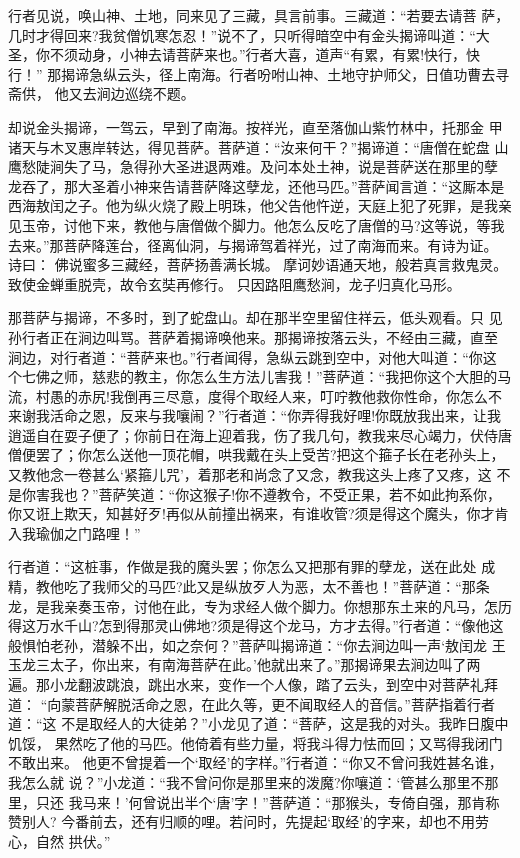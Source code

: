 行者见说，唤山神、土地，同来见了三藏，具言前事。三藏道：“若要去请菩
萨，几时才得回来?我贫僧饥寒怎忍！”说不了，只听得暗空中有金头揭谛叫道：“大
圣，你不须动身，小神去请菩萨来也。”行者大喜，道声“有累，有累!快行，快行！”
那揭谛急纵云头，径上南海。行者吩咐山神、土地守护师父，日值功曹去寻斋供，
他又去涧边巡绕不题。

却说金头揭谛，一驾云，早到了南海。按祥光，直至落伽山紫竹林中，托那金
甲诸天与木叉惠岸转达，得见菩萨。菩萨道：“汝来何干？”揭谛道：“唐僧在蛇盘
山鹰愁陡涧失了马，急得孙大圣进退两难。及问本处土神，说是菩萨送在那里的孽
龙吞了，那大圣着小神来告请菩萨降这孽龙，还他马匹。”菩萨闻言道：“这厮本是
西海敖闰之子。他为纵火烧了殿上明珠，他父告他忤逆，天庭上犯了死罪，是我亲
见玉帝，讨他下来，教他与唐僧做个脚力。他怎么反吃了唐僧的马?这等说，等我
去来。”那菩萨降莲台，径离仙洞，与揭谛驾着祥光，过了南海而来。有诗为证。
诗曰：
佛说蜜多三藏经，菩萨扬善满长城。
摩诃妙语通天地，般若真言救鬼灵。
致使金蝉重脱壳，故令玄奘再修行。
只因路阻鹰愁涧，龙子归真化马形。

那菩萨与揭谛，不多时，到了蛇盘山。却在那半空里留住祥云，低头观看。只
见孙行者正在涧边叫骂。菩萨着揭谛唤他来。那揭谛按落云头，不经由三藏，直至
涧边，对行者道：“菩萨来也。”行者闻得，急纵云跳到空中，对他大叫道：“你这
个七佛之师，慈悲的教主，你怎么生方法儿害我！”菩萨道：“我把你这个大胆的马
流，村愚的赤尻!我倒再三尽意，度得个取经人来，叮咛教他救你性命，你怎么不
来谢我活命之恩，反来与我嚷闹？”行者道：“你弄得我好哩!你既放我出来，让我
逍遥自在耍子便了；你前日在海上迎着我，伤了我几句，教我来尽心竭力，伏侍唐
僧便罢了；你怎么送他一顶花帽，哄我戴在头上受苦?把这个箍子长在老孙头上，
又教他念一卷甚么‘紧箍儿咒’，着那老和尚念了又念，教我这头上疼了又疼，这
不是你害我也？”菩萨笑道：“你这猴子!你不遵教令，不受正果，若不如此拘系你，
你又诳上欺天，知甚好歹!再似从前撞出祸来，有谁收管?须是得这个魔头，你才肯
入我瑜伽之门路哩！”

行者道：“这桩事，作做是我的魔头罢；你怎么又把那有罪的孽龙，送在此处
成精，教他吃了我师父的马匹?此又是纵放歹人为恶，太不善也！”菩萨道：“那条
龙，是我亲奏玉帝，讨他在此，专为求经人做个脚力。你想那东土来的凡马，怎历
得这万水千山?怎到得那灵山佛地?须是得这个龙马，方才去得。”行者道：“像他这
般惧怕老孙，潜躲不出，如之奈何？”菩萨叫揭谛道：“你去涧边叫一声‘敖闰龙
王玉龙三太子，你出来，有南海菩萨在此。’他就出来了。”那揭谛果去涧边叫了两
遍。那小龙翻波跳浪，跳出水来，变作一个人像，踏了云头，到空中对菩萨礼拜道：
“向蒙菩萨解脱活命之恩，在此久等，更不闻取经人的音信。”菩萨指着行者道：“这
不是取经人的大徒弟？”小龙见了道：“菩萨，这是我的对头。我昨日腹中饥馁，
果然吃了他的马匹。他倚着有些力量，将我斗得力怯而回；又骂得我闭门不敢出来。
他更不曾提着一个‘取经’的字样。”行者道：“你又不曾问我姓甚名谁，我怎么就
说？”小龙道：“我不曾问你是那里来的泼魔?你嚷道：‘管甚么那里不那里，只还
我马来！’何曾说出半个‘唐’字！”菩萨道：“那猴头，专倚自强，那肯称赞别人?
今番前去，还有归顺的哩。若问时，先提起‘取经’的字来，却也不用劳心，自然
拱伏。”

